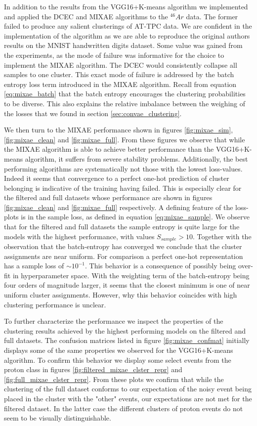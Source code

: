 In addition to the results from the VGG16+K-means algorithm we implemented and applied the DCEC and MIXAE algorithms to the ${}^{46}Ar$ data. The former failed to produce any salient clusterings of AT-TPC data. We are confident in the implementation of the algorithm as we are able to reproduce the original authors results on the MNIST handwritten digits dataset. Some value was gained from the experiments, as the mode of failure was informative for the choice to implement the MIXAE algorithm. The DCEC would consistently collapse all samples to one cluster. This exact mode of failure is addressed by the batch entropy loss term introduced in the MIXAE algorithm. Recall from equation \ref{eq:mixae_batch} that the batch entropy encourages the clustering probabilities to be diverse. This also explains the relative imbalance between the weighing of the losses that we found in section \ref{sec:convae_clustering}.

We then turn to the MIXAE performance shown in figures \ref{fig:mixae_sim}, \ref{fig:mixae_clean} and \ref{fig:mixae_full}. From these figures we observe that while the MIXAE algorithm is able to achieve better performance than the VGG16+K-means algorithm, it suffers from severe stability problems. Additionally, the best performing algorithms are systematically not those with the lowest loss-values. Indeed it seems that convergence to a perfect one-hot prediction of cluster belonging is indicative of the training having failed. This is especially clear for the filtered and full datasets whose performance are shown in figures \ref{fig:mixae_clean} and \ref{fig:mixae_full} respectively. A defining feature of the loss-plots is in the sample loss, as defined in equation \ref{eq:mixae_sample}. We observe that for the filtered and full datasets the sample entropy is quite large for the models with the highest performance, with values $S_{sample} > 10$. Together with the observation that the batch-entropy has converged we conclude that the cluster assignments are near uniform. For comparison a perfect one-hot representation has a sample loss of $\sim 10^{-1}$. This behavior is a consequence of possibly being over-fit in hyperparameter space. With the weighting term of the batch-entropy being four orders of magnitude larger, it seems that the closest minimum is one of near uniform cluster assignments. However, why this behavior coincides with high clustering performance is unclear.

To further characterize the performance we inspect the properties of the clustering results achieved by the highest performing models on the filtered and full datasets. The confusion matrices listed in figure \ref{fig:mixae_confmat} initially displays some of the same properties we observed for the VGG16+K-means algorithm. To confirm this behavior we display some select events from the proton class in figures \ref{fig:filtered_mixae_clster_repr} and \ref{fig:full_mixae_clster_repr}. From these plots we confirm that while the clustering of the full dataset conforms to our expectation of the noisy event being placed in the cluster with the "other" events, our expectations are not met for the filtered dataset. In the latter case the different clusters of proton events do not seem to be visually distinguishable.

